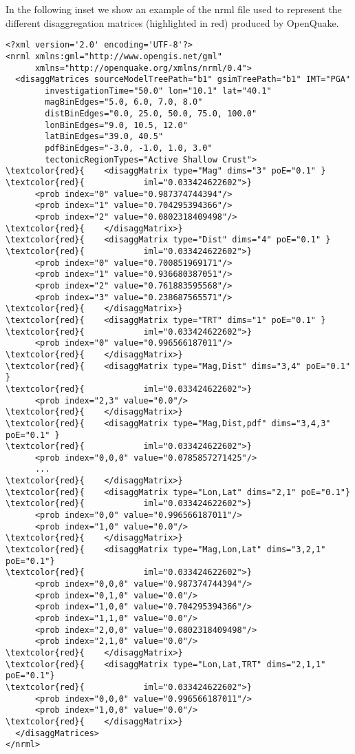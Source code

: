 In the following inset we show an example of the nrml file 
used to represent the different disaggregation matrices (highlighted 
in red) produced by OpenQuake.
%
\begin{Verbatim}[frame=single, commandchars=\\\{\}, fontsize=\small]
<?xml version='2.0' encoding='UTF-8'?>
<nrml xmlns:gml="http://www.opengis.net/gml" 
      xmlns="http://openquake.org/xmlns/nrml/0.4">
  <disaggMatrices sourceModelTreePath="b1" gsimTreePath="b1" IMT="PGA" 
        investigationTime="50.0" lon="10.1" lat="40.1" 
        magBinEdges="5.0, 6.0, 7.0, 8.0" 
        distBinEdges="0.0, 25.0, 50.0, 75.0, 100.0" 
        lonBinEdges="9.0, 10.5, 12.0" 
        latBinEdges="39.0, 40.5" 
        pdfBinEdges="-3.0, -1.0, 1.0, 3.0" 
        tectonicRegionTypes="Active Shallow Crust">
\textcolor{red}{    <disaggMatrix type="Mag" dims="3" poE="0.1" }
\textcolor{red}{            iml="0.033424622602">}
      <prob index="0" value="0.987374744394"/>
      <prob index="1" value="0.704295394366"/>
      <prob index="2" value="0.0802318409498"/>
\textcolor{red}{    </disaggMatrix>}
\textcolor{red}{    <disaggMatrix type="Dist" dims="4" poE="0.1" }
\textcolor{red}{            iml="0.033424622602">}
      <prob index="0" value="0.700851969171"/>
      <prob index="1" value="0.936680387051"/>
      <prob index="2" value="0.761883595568"/>
      <prob index="3" value="0.238687565571"/>
\textcolor{red}{    </disaggMatrix>}
\textcolor{red}{    <disaggMatrix type="TRT" dims="1" poE="0.1" }
\textcolor{red}{            iml="0.033424622602">}
      <prob index="0" value="0.996566187011"/>
\textcolor{red}{    </disaggMatrix>}
\textcolor{red}{    <disaggMatrix type="Mag,Dist" dims="3,4" poE="0.1" }
\textcolor{red}{            iml="0.033424622602">}
      <prob index="2,3" value="0.0"/>
\textcolor{red}{    </disaggMatrix>}
\textcolor{red}{    <disaggMatrix type="Mag,Dist,pdf" dims="3,4,3" poE="0.1" }
\textcolor{red}{            iml="0.033424622602">}
      <prob index="0,0,0" value="0.0785857271425"/>
      ...
\textcolor{red}{    </disaggMatrix>}
\textcolor{red}{    <disaggMatrix type="Lon,Lat" dims="2,1" poE="0.1"}
\textcolor{red}{            iml="0.033424622602">}
      <prob index="0,0" value="0.996566187011"/>
      <prob index="1,0" value="0.0"/>
\textcolor{red}{    </disaggMatrix>}
\textcolor{red}{    <disaggMatrix type="Mag,Lon,Lat" dims="3,2,1" poE="0.1"} 
\textcolor{red}{            iml="0.033424622602">}
      <prob index="0,0,0" value="0.987374744394"/>
      <prob index="0,1,0" value="0.0"/>
      <prob index="1,0,0" value="0.704295394366"/>
      <prob index="1,1,0" value="0.0"/>
      <prob index="2,0,0" value="0.0802318409498"/>
      <prob index="2,1,0" value="0.0"/>
\textcolor{red}{    </disaggMatrix>}
\textcolor{red}{    <disaggMatrix type="Lon,Lat,TRT" dims="2,1,1" poE="0.1"} 
\textcolor{red}{            iml="0.033424622602">}
      <prob index="0,0,0" value="0.996566187011"/>
      <prob index="1,0,0" value="0.0"/>
\textcolor{red}{    </disaggMatrix>}
  </disaggMatrices>
</nrml>

\end{Verbatim}

